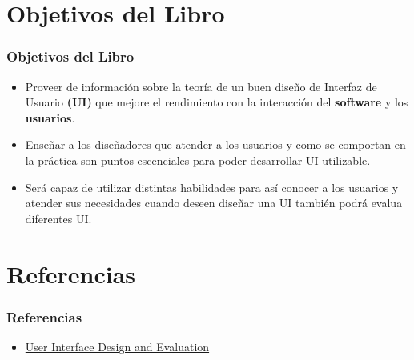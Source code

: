 \documentclass[11pt]{beamer}
\begin{document}
\section{Objetivos del Libro}
\begin{frame}
\frametitle{Objetivos del Libro}
\begin{itemize}
\item Proveer de información sobre la teoría de un buen diseño de Interfaz de Usuario {\bf (UI)} que mejore el rendimiento con la interacción del {\bf software} y los {\bf usuarios}.
\end{itemize}
\begin{itemize}
\item Enseñar a los diseñadores que atender a los usuarios y como se comportan en la práctica son puntos escenciales para poder desarrollar UI utilizable.
\end{itemize}
\begin{itemize}
\item Será capaz de utilizar distintas habilidades para así conocer a los usuarios y atender sus necesidades cuando deseen diseñar una UI también podrá evalua diferentes UI.
\end{itemize}
\end{frame}





\section{Referencias}
\begin{frame}
\frametitle{Referencias}
\begin{itemize}
\item \href{https://studylib.net/doc/25182344/-debbie-stone--caroline-jarrett--mark-woodroffe--s-bookfi-}{User Interface Design and Evaluation}
\end{itemize}
\end{frame}
\end{document}
